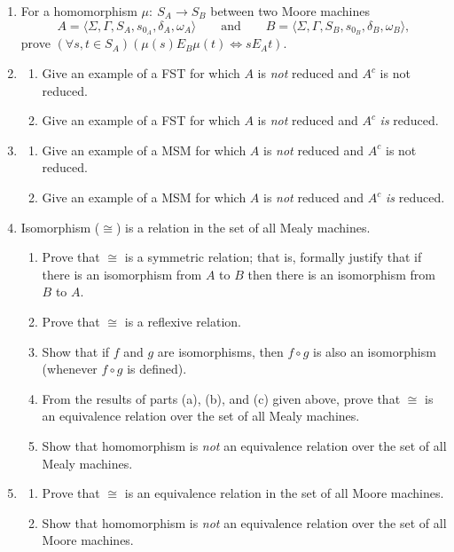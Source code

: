 \begin{enumerate}[{7.}1.]
\item For a homomorphism $\mu$$:\ S_A \rightarrow S_B$ between two Moore machines
\[ A=\langle\Sigma,\Gamma,S_A,s_{0_A},\delta_A,\omega_A\rangle\qquad\text{and}
	\qquad B=\langle\Sigma,\Gamma,S_B,s_{0_B},\delta_B,\omega_B\rangle, \]
prove $(\forall s,t \in S_A)(\mu(s) E_B \mu(t) \Leftrightarrow s E_A t)$.

\item \begin{enumerate}
\item Give an example of a FST for which $A$ is \emph{not} reduced and $A^c$ is
not reduced.
\item Give an example of a FST for which $A$ is \emph{not} reduced and $A^c$
\emph{is} reduced.
\end{enumerate}

\item \begin{enumerate}
\item Give an example of a MSM for which $A$ is \emph{not} reduced and $A^c$ is
not reduced.
\item Give an example of a MSM for which $A$ is \emph{not} reduced and $A^c$
\emph{is} reduced.
\end{enumerate}

\item Isomorphism ($\cong$) is a relation in the set of all Mealy machines.
\begin{enumerate}
\item Prove that $\cong$ is a symmetric relation; that is, formally justify that
if there is an isomorphism from $A$ to $B$ then there is an isomorphism from $B$
to $A$.
\item Prove that $\cong$ is a reflexive relation.
\item Show that if $f$ and $g$ are isomorphisms, then $f \circ g$ is also an
isomorphism (whenever $f \circ g$ is defined).
\item From the results of parts (a), (b), and (c) given above, prove that
$\cong$ is an equivalence relation over the set of all Mealy machines.
\item Show that homomorphism is \emph{not} an equivalence relation over the set of all
Mealy machines.
\end{enumerate}

\item \begin{enumerate}
\item Prove that $\cong$ is an equivalence relation in the set of all Moore
machines.
\item Show that homomorphism is \emph{not} an equivalence relation over the set of all
Moore machines.
\end{enumerate}


\end{enumerate}
